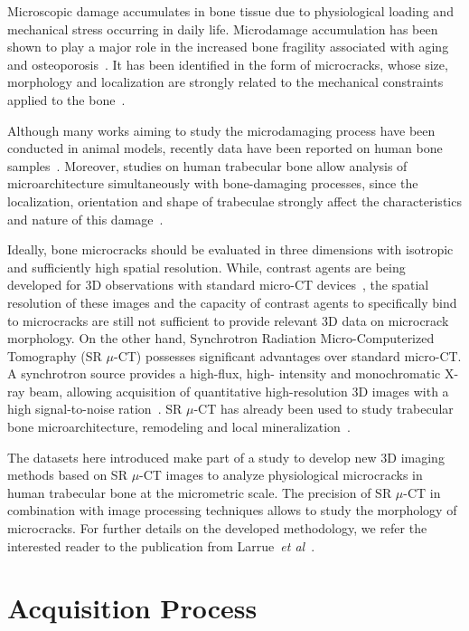 \documentclass{InsightArticle}
\begin{document}
Microscopic damage accumulates in bone tissue due to physiological loading and
mechanical stress occurring in daily life. Microdamage accumulation has been
shown to play a major role in the increased bone fragility associated with aging
and osteoporosis~\cite{Fazzalari2002}. It has been identified in the form of
microcracks, whose size, morphology and localization are strongly related to the
mechanical constraints applied to the bone~\cite{Fratzl2008}.

Although many works aiming to study the microdamaging process have been
conducted in animal models, recently data have been reported on human bone
samples~\cite{Fratzl2008}. Moreover, studies on human trabecular bone allow
analysis of microarchitecture simultaneously with bone-damaging processes,
since the localization, orientation and shape of trabeculae strongly affect the
characteristics and nature of this damage~\cite{Fazzalari2002}.

Ideally, bone microcracks should be evaluated in three dimensions with isotropic
and sufficiently high spatial resolution. While, contrast agents are being
developed for 3D observations with standard micro-CT devices~\cite{Leng2008},
the spatial resolution of these images and the capacity of contrast agents to
specifically bind to microcracks are still not sufficient to provide relevant
3D data on microcrack morphology. On the other hand, Synchrotron Radiation
Micro-Computerized Tomography (SR $\mu$-CT) possesses significant advantages
over standard micro-CT. A synchrotron source provides a high-flux, high-
intensity and monochromatic X-ray beam, allowing acquisition of quantitative
high-resolution 3D images with a high signal-to-noise ration~\cite{Salome1999}.
SR $\mu$-CT has already been used to study trabecular bone microarchitecture,
remodeling and local mineralization~\cite{Nuzzo2002}.

The datasets here introduced make part of a study to develop new 3D imaging
methods based on SR $\mu$-CT images to analyze physiological microcracks in
human trabecular bone at the micrometric scale. The precision of SR $\mu$-CT
in combination with image processing techniques allows to study the morphology
of microcracks. For further details on the developed methodology, we refer the
interested reader to the publication from Larrue~\textit{et al}~\cite{Larrue2011}.

\section{Acquisition Process}
\end{document}

